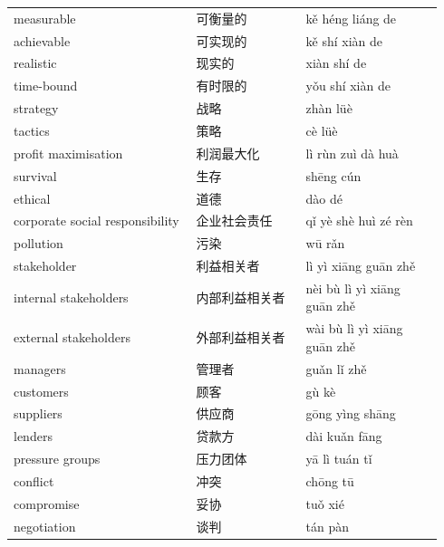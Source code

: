 \documentclass[11pt]{article}
\begin{document}
\begin{longtable}{@{}p{0.40\linewidth}p{0.24\linewidth}p{0.30\linewidth}@{}}
measurable & 可衡量的 & kě héng liáng de \\
achievable & 可实现的 & kě shí xiàn de \\
realistic & 现实的 & xiàn shí de \\
time-bound & 有时限的 & yǒu shí xiàn de \\
strategy & 战略 & zhàn lüè \\
tactics & 策略 & cè lüè \\
profit maximisation & 利润最大化 & lì rùn zuì dà huà \\
survival & 生存 & shēng cún \\
ethical & 道德 & dào dé \\
corporate social responsibility & 企业社会责任 & qǐ yè shè huì zé rèn \\
pollution & 污染 & wū rǎn \\
stakeholder & 利益相关者 & lì yì xiāng guān zhě \\
internal stakeholders & 内部利益相关者 & nèi bù lì yì xiāng guān zhě \\
external stakeholders & 外部利益相关者 & wài bù lì yì xiāng guān zhě \\
managers & 管理者 & guǎn lǐ zhě \\
customers & 顾客 & gù kè \\
suppliers & 供应商 & gōng yìng shāng \\
lenders & 贷款方 & dài kuǎn fāng \\
pressure groups & 压力团体 & yā lì tuán tǐ \\
conflict & 冲突 & chōng tū \\
compromise & 妥协 & tuǒ xié \\
negotiation & 谈判 & tán pàn \\
\end{longtable}
\end{document}
